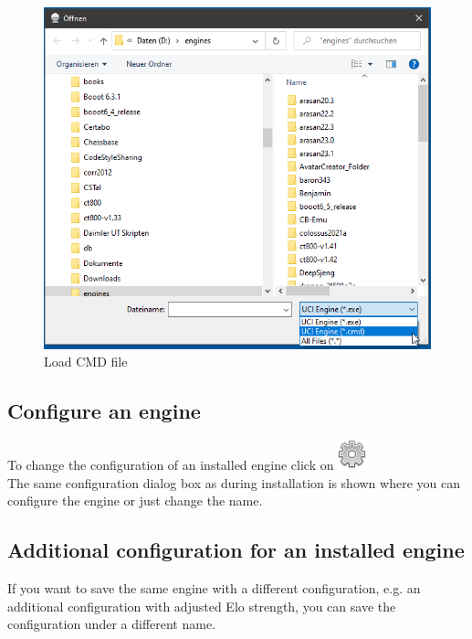 \documentclass[11pt,a4paper]{article}
\begin{document}
\begin{figure}[H]
	\centering
	\includegraphics[scale=0.8]{LoadEngineCmd.png}
	\caption{Load CMD file}
	\label{fig:LoadCMDfile}
\end{figure}


\subsection{Configure an engine}

To change the configuration of an installed engine click on \includegraphics[scale=0.5]{cog.png}\\
The same configuration dialog box as during installation is shown where you can configure the engine or just change the name.

\subsection{Additional configuration for an installed engine}

If you want to save the same engine with a different configuration, e.g. an additional configuration with adjusted Elo strength, you can save the configuration under a different name.
\end{document}
